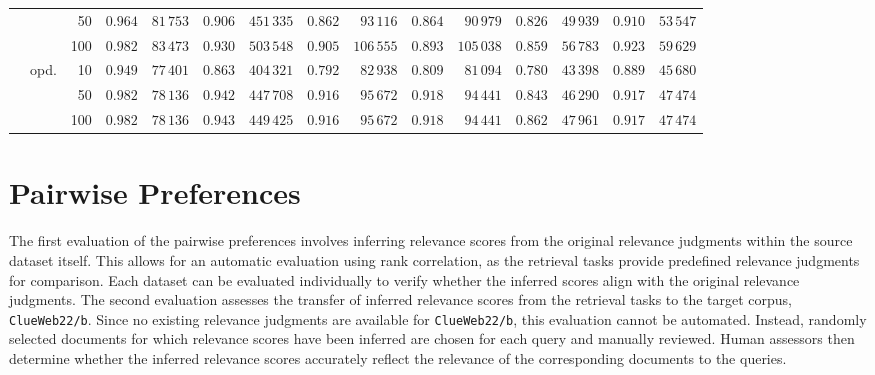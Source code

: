 \begin{table}[t]
{\begin{tabular}{ccrcrcrcrcrcrcr}
                                                                             &  &  50 & $0.964$ & $81\,753$ & $0.906$ & $451\,335$ & $0.862$ &  $93\,116$ & $0.864$ &  $90\,979$ & $0.826$ & $49\,939$ & $0.910$ & $53\,547$ \\
                                                                             &  & 100 & $0.982$ & $83\,473$ & $0.930$ & $503\,548$ & $0.905$ & $106\,555$ & $0.893$ & $105\,038$ & $0.859$ & $56\,783$ & $0.923$ & $59\,629$ \\
        \cmidrule(lr){2-15}
                                                        & \multirow{3}{*}{opd.}  &  10 & $0.949$ & $77\,401$ & $0.863$ & $404\,321$ & $0.792$ & $82\,938$ & $0.809$ & $81\,094$ & $0.780$ & $43\,398$ & $0.889$ & $45\,680$ \\
                                                                             &  &  50 & $0.982$ & $78\,136$ & $0.942$ & $447\,708$ & $0.916$ & $95\,672$ & $0.918$ & $94\,441$ & $0.843$ & $46\,290$ & $0.917$ & $47\,474$ \\
                                                                             &  & 100 & $0.982$ & $78\,136$ & $0.943$ & $449\,425$ & $0.916$ & $95\,672$ & $0.918$ & $94\,441$ & $0.862$ & $47\,961$ & $0.917$ & $47\,474$ \\

        \bottomrule 
    \end{tabular}}
    \renewcommand{\arraystretch}{1.0}
\end{table}


\section{Pairwise Preferences}\label{eval-pairwise-preferences}

The first evaluation of the pairwise preferences involves inferring relevance scores from the original relevance judgments within the source dataset itself. This allows for an automatic evaluation using rank correlation, as the retrieval tasks provide predefined relevance judgments for comparison. Each dataset can be evaluated individually to verify whether the inferred scores align with the original relevance judgments. The second evaluation assesses the transfer of inferred relevance scores from the retrieval tasks to the target corpus, \texttt{ClueWeb22/b}. Since no existing relevance judgments are available for \texttt{ClueWeb22/b}, this evaluation cannot be automated. Instead, randomly selected documents for which relevance scores have been inferred are chosen for each query and manually reviewed. Human assessors then determine whether the inferred relevance scores accurately reflect the relevance of the corresponding documents to the queries.

